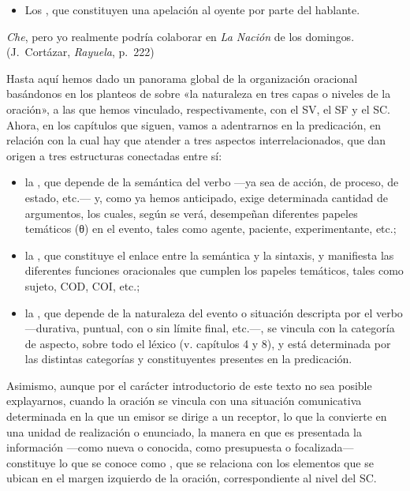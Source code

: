 \begin{recuadro}
\begin{itemize}
  \item Los , que constituyen una apelación al oyente por
        parte del hablante.
\end{itemize}

\begin{exe}
  \ex \textit{Che}, pero yo realmente podría colaborar en \textit{La Nación} de
      los domingos. (J.~Cortázar, \textit{Rayuela}, p.~222)
\end{exe}
\end{recuadro}

\begin{recuadro}
Hasta aquí hemos dado un panorama global de la organización oracional
basándonos en los planteos de \textcite{rizzi1995} sobre «la naturaleza en tres
capas o niveles de la oración», a las que hemos vinculado, respectivamente, con
el SV, el SF y el SC. Ahora, en los capítulos que siguen, vamos a adentrarnos en
la predicación, en relación con la cual hay que atender a tres aspectos
interrelacionados, que dan origen a tres estructuras conectadas entre sí:

\begin{itemize}
  \item la , que depende de la semántica
        del verbo ---ya sea de acción, de proceso, de estado, etc.--- y, como ya
        hemos anticipado, exige determinada cantidad de argumentos, los cuales,
        según se verá, desempeñan diferentes papeles temáticos (θ) en el evento,
        tales como agente, paciente, experimentante, etc.;
  \item la , que constituye el enlace entre la
        semántica y la sintaxis, y manifiesta las diferentes funciones
        oracionales que cumplen los papeles temáticos, tales como sujeto, COD,
        COI, etc.;
  \item la , que depende de la naturaleza del
        evento o situación descripta por el verbo ---durativa, puntual, con o
        sin límite final, etc.---, se vincula con la categoría de aspecto, sobre
        todo el léxico (v. capítulos 4 y 8), y está determinada por las distintas
        categorías y constituyentes presentes en la predicación.
\end{itemize}

Asimismo, aunque por el carácter introductorio de este texto no sea posible
explayarnos, cuando la oración se vincula con una situación comunicativa
determinada en la que un emisor se dirige a un receptor, lo que la convierte en
una unidad de realización o enunciado, la manera en que es presentada la
información ---como nueva o conocida, como presupuesta o focalizada---
constituye lo que se conoce como , que se
relaciona con los elementos que se ubican en el margen izquierdo de la oración,
correspondiente al nivel del SC.
\end{recuadro}

